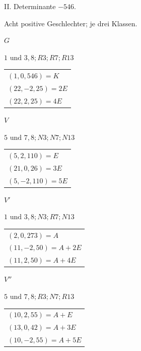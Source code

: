 \begin{center}II. Determinante \(-546\).\par\smallskip Acht positive Geschlechter; je drei Klassen.\end{center}
\begin{center}
\begin{minipage}[t]{0.47\linewidth}\centering
\(G\)\par\smallskip
{\small \(1\text{ und }3, 8; R3; R7; R13\)}\par\smallskip
\begin{tabular}{@{}l@{}}
\((1,0,546)=K\)\\\((22,-2,25)=2E\)\\\((22,2,25)=4E\)
\end{tabular}
\end{minipage}\hfill\begin{minipage}[t]{0.47\linewidth}\centering
\(V\)\par\smallskip
{\small \(5\text{ und }7, 8; N3; N7; N13\)}\par\smallskip
\begin{tabular}{@{}l@{}}
\((5,2,110)=E\)\\\((21,0,26)=3E\)\\\((5,-2,110)=5E\)
\end{tabular}
\end{minipage}
\end{center}
\begin{center}
\begin{minipage}[t]{0.47\linewidth}\centering
\(V'\)\par\smallskip
{\small \(1\text{ und }3, 8; N3; R7; N13\)}\par\smallskip
\begin{tabular}{@{}l@{}}
\((2,0,273)=A\)\\\((11,-2,50)=A+2E\)\\\((11,2,50)=A+4E\)
\end{tabular}
\end{minipage}\hfill\begin{minipage}[t]{0.47\linewidth}\centering
\(V''\)\par\smallskip
{\small \(5\text{ und }7, 8; R3; N7; R13\)}\par\smallskip
\begin{tabular}{@{}l@{}}
\((10,2,55)=A+E\)\\\((13,0,42)=A+3E\)\\\((10,-2,55)=A+5E\)
\end{tabular}
\end{minipage}
\end{center}
